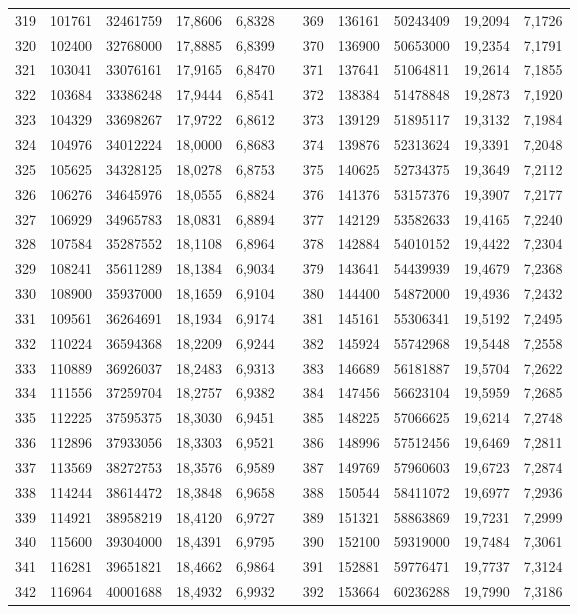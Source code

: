 \begin{longtable}{rrrrrrrrrrr}
319&101761&32461759&17,8606&6,8328&&369&136161&50243409&19,2094&7,1726\\
320&102400&32768000&17,8885&6,8399&&370&136900&50653000&19,2354&7,1791\\
321&103041&33076161&17,9165&6,8470&&371&137641&51064811&19,2614&7,1855\\
322&103684&33386248&17,9444&6,8541&&372&138384&51478848&19,2873&7,1920\\
323&104329&33698267&17,9722&6,8612&&373&139129&51895117&19,3132&7,1984\\
324&104976&34012224&18,0000&6,8683&&374&139876&52313624&19,3391&7,2048\\
325&105625&34328125&18,0278&6,8753&&375&140625&52734375&19,3649&7,2112\\
326&106276&34645976&18,0555&6,8824&&376&141376&53157376&19,3907&7,2177\\
327&106929&34965783&18,0831&6,8894&&377&142129&53582633&19,4165&7,2240\\
328&107584&35287552&18,1108&6,8964&&378&142884&54010152&19,4422&7,2304\\
329&108241&35611289&18,1384&6,9034&&379&143641&54439939&19,4679&7,2368\\
330&108900&35937000&18,1659&6,9104&&380&144400&54872000&19,4936&7,2432\\
331&109561&36264691&18,1934&6,9174&&381&145161&55306341&19,5192&7,2495\\
332&110224&36594368&18,2209&6,9244&&382&145924&55742968&19,5448&7,2558\\
333&110889&36926037&18,2483&6,9313&&383&146689&56181887&19,5704&7,2622\\
334&111556&37259704&18,2757&6,9382&&384&147456&56623104&19,5959&7,2685\\
335&112225&37595375&18,3030&6,9451&&385&148225&57066625&19,6214&7,2748\\
336&112896&37933056&18,3303&6,9521&&386&148996&57512456&19,6469&7,2811\\
337&113569&38272753&18,3576&6,9589&&387&149769&57960603&19,6723&7,2874\\
338&114244&38614472&18,3848&6,9658&&388&150544&58411072&19,6977&7,2936\\
339&114921&38958219&18,4120&6,9727&&389&151321&58863869&19,7231&7,2999\\
340&115600&39304000&18,4391&6,9795&&390&152100&59319000&19,7484&7,3061\\
341&116281&39651821&18,4662&6,9864&&391&152881&59776471&19,7737&7,3124\\
342&116964&40001688&18,4932&6,9932&&392&153664&60236288&19,7990&7,3186\\

\end{longtable}
